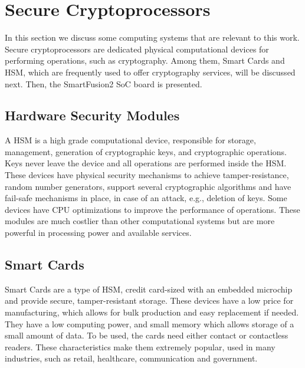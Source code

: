 \section{Secure Cryptoprocessors}\label{chap:background:cryptoprocessors}

In this section we discuss some computing systems that are relevant to this work. 
Secure cryptoprocessors are dedicated physical computational devices for performing operations, such as cryptography. Among them, Smart Cards and \ac{HSM}, which are frequently used to offer cryptography services, will be discussed next. Then, the SmartFusion2 \ac{SoC} board is presented.

\subsection{Hardware Security Modules}\label{chap:background:computing:hsm}

A \ac{HSM} is a high grade computational device, responsible for storage, management, generation of cryptographic keys, and cryptographic operations. Keys never leave the device and all operations are performed inside the \ac{HSM}. These devices have physical security mechanisms to achieve tamper-resistance, random number generators, support several cryptographic algorithms and have fail-safe mechanisms in place, in case of an attack, e.g., deletion of keys. Some devices have \ac{CPU} optimizations to improve the performance of operations.
These modules are much costlier than other computational systems but are more powerful in processing power and available services.

\subsection{Smart Cards}\label{chap:background:computing:smartcards}

Smart Cards are a type of \ac{HSM}, credit card-sized with an embedded microchip and provide secure, tamper-resistant storage. These devices have a low price for manufacturing, which allows for bulk production and easy replacement if needed. They have a low computing power, and small memory which allows storage of a small amount of data. To be used, the cards need either contact or contactless readers. These characteristics make them extremely popular, used in many industries, such as retail, healthcare, communication and government.

